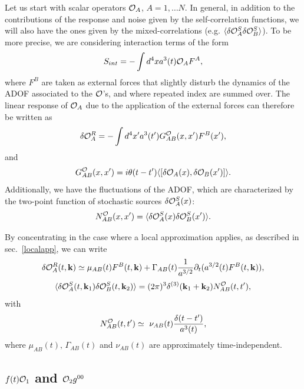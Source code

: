 \documentclass[11pt,amsmath,floats,floatfix,nofootinbib,secnumarabic, superscriptaddress, tightenlines]{revtex4}
\newcommand{\beq}{\begin{equation}}
\newcommand{\eeq}{\end{equation}}
\newcommand{\be}{\begin{equation}}
\newcommand{\ee}{\end{equation}}
\newcommand{\calo}{{\cal O}}
\begin{document}
{Let us start with scalar operators $\calo_A$, $A=1,\ldots N$. In general, in addition to the contributions of the response and noise given by the self-correlation functions, we will also have the ones given by the  mixed-correlations (e.g. $\langle\delta\calo^S_A\delta\calo^S_B\rangle$).  To be more precise, we are considering interaction terms of the form
\be S_{int}=-\int d^4x a^3(t) \calo_A F^A, \ee
where $F^B$ are taken as external forces that slightly disturb the dynamics of the ADOF associated to the $\calo$'s, and where repeated index are summed over. The linear response of $\calo_A$ due to the application of the external forces can therefore be written as
\be \delta\calo_A^R=-\int d^4x' a^3(t') G_{AB}^\calo(x,x') F^B(x'),\label{deltaO}\ee
and
\be G_{AB}^\calo(x,x')=i \theta(t-t')\langle[\delta\calo_A(x), \delta\calo_B(x')]\rangle.\ee
Additionally, we have the fluctuations of the ADOF, which are characterized by the two-point function of stochastic sources  $\delta\calo^S_A(x)$:
\be N_{AB}^\calo(x,x')= \langle\delta\calo^S_A(x)\delta\calo^S_B(x') \rangle.\ee

By concentrating in the case where a local approximation applies, as described in sec.~\ref{localapp}, we can write
\beq
\label{respoLoc}
 \delta\calo_A^R(t,{\bf k})\simeq \mu_{AB}(t) F^B(t,{\bf k})+\Gamma_{AB}(t)\frac{1}{a^{3/2}} \partial_{t}(a^{3/2}(t) F^B(t, {\bf k})),
\eeq
\beq \langle\delta{{\calo}}_A^S(t,{\bf k}_1)\delta{{\calo}}^S_B(t,{\bf k}_2)\rangle=(2\pi)^3\delta^{(3)}({\bf k}_1+{\bf k}_2)
{N}_{AB}^{\calo}(t,t'),\eeq
with
\be  {N}_{AB}^\calo(t,t')\simeq~ \nu_{AB}(t) \frac{ \delta(t-t')}{a^{3}(t)},\ee where $\mu_{AB}(t),\,\Gamma_{AB}(t)$ and $\nu_{AB}(t)$ are approximately time-independent.

\subsection{$ f(t)\calo_1$ and $\calo_2 g^{00}$}

}
\end{document}
